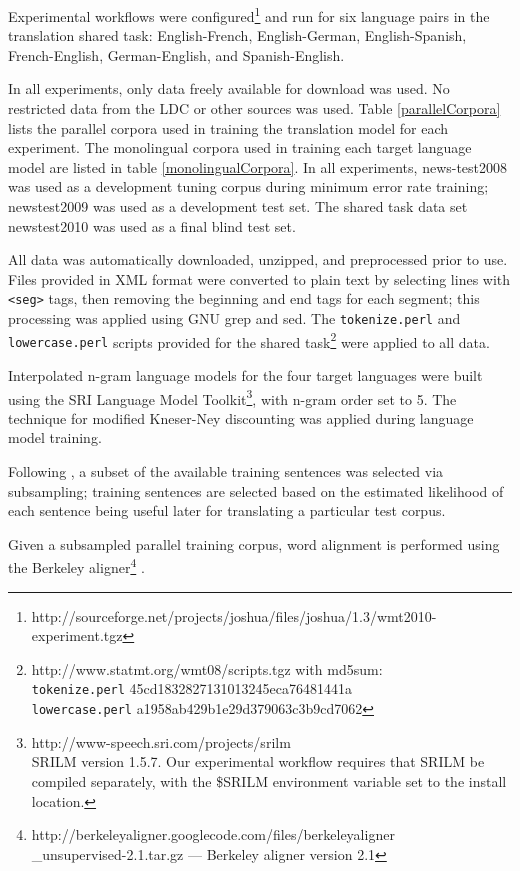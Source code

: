 \documentclass[11pt]{article}
\begin{document}
Experimental workflows were configured\footnote{http://sourceforge.net/projects/joshua/files/joshua/1.3/wmt2010-experiment.tgz} and run for six language pairs in the translation shared task: English-French, English-German, English-Spanish, French-English, German-English, and Spanish-English. 

In all experiments, only data freely available for download was used. No restricted data from the LDC or other sources was used. Table \ref{parallelCorpora} lists the parallel corpora used in training the translation model for each experiment. The monolingual corpora used in training each target language model are listed in table \ref{monolingualCorpora}. In all experiments, news-test2008 was used as a development tuning corpus during minimum error rate training; newstest2009 was used as a development test set. The shared task data set newstest2010 was used as a final blind test set.

All data was automatically downloaded, unzipped, and preprocessed prior to use. Files provided in XML format were converted to plain text by selecting lines with {\tt <seg>} tags, then removing the beginning and end tags for each segment; this processing was applied using GNU grep and sed. The {\tt tokenize.perl} and {\tt lowercase.perl} scripts provided for the shared task\footnote{http://www.statmt.org/wmt08/scripts.tgz with md5sum: \\ {\tt tokenize.perl} 45cd1832827131013245eca76481441a \\ {\tt lowercase.perl} a1958ab429b1e29d379063c3b9cd7062} were applied to all data.

Interpolated n-gram language models for the four target languages were built using the SRI Language Model Toolkit\footnote{ http://www-speech.sri.com/projects/srilm \\ SRILM version 1.5.7. Our experimental workflow requires that SRILM be compiled separately, with the \$SRILM environment variable set to the install location.}, with n-gram order set to 5. The  technique for modified Kneser-Ney discounting \cite{Kneser1995} was applied during language model training.

Following , a subset of the available training sentences was selected via subsampling; training sentences are selected based on the estimated likelihood of each sentence being useful later for translating a particular test corpus. 


Given a subsampled parallel training corpus, word alignment is performed using the Berkeley aligner\footnote{http://berkeleyaligner.googlecode.com/files/berkeleyaligner\\\_unsupervised-2.1.tar.gz --- Berkeley aligner version 2.1} \cite{liang06alignment}. 
\end{document}
